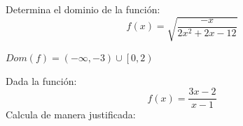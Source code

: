 \documentclass[addpoints,spanish, 12pt,a4paper]{exam}
\begin{document}
\begin{questions}
\begin{multicols}{2}
\begin{parts}
        \end{parts}
    \end{multicols}
    
\question[2] Determina el dominio de la función:  $$f(x)=\sqrt {\dfrac{-x}{2 x^{2} + 2 x - 12}}$$
\begin{solution}   $Dom\left(f \right)=\left(-\infty, -3\right)\cup \left[0, 2\right)$   \end{solution}

\question Dada la función: $$f(x)=\dfrac{3 x - 2}{x - 1}$$ Calcula de manera justificada:




\end{questions}
\end{document}
